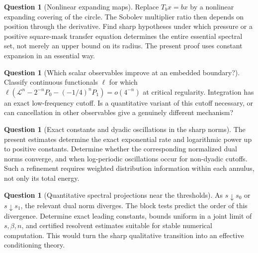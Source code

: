\documentclass[11pt,a4paper]{article}
\theoremstyle{definition}
\newtheorem{question}[theorem]{Question}
\theoremstyle{remark}
\newcommand{\Lop}{\mathcal L}
\numberwithin{equation}{section}
\begin{document}
\begin{question}[Nonlinear expanding maps]
Replace $T_bx=bx$ by a nonlinear expanding covering of the circle. The
Sobolev multiplier ratio then depends on position through the derivative.
Find sharp hypotheses under which pressure or a positive square-mask
transfer equation determines the entire essential spectral set, not merely
an upper bound on its radius. The present proof uses constant expansion
in an essential way.
\end{question}

\begin{question}[Which scalar observables improve at an embedded boundary?]
Classify continuous functionals $\ell$ for which
$\ell(\Lop^n-2^{-n}P_0-(-1/4)^nP_1)=o(4^{-n})$ at critical regularity.
Integration has an exact low-frequency cutoff. Is a quantitative variant
of this cutoff necessary, or can cancellation in other observables give
a genuinely different mechanism?
\end{question}

\begin{question}[Exact constants and dyadic oscillations in the sharp norms]
The present estimates determine the exact exponential rate and logarithmic
power up to positive constants. Determine whether the corresponding
normalized dual norms converge, and when log-periodic oscillations occur
for non-dyadic cutoffs. Such a refinement requires weighted distribution
information within each annulus, not only its total energy.
\end{question}

\begin{question}[Quantitative spectral projections near the thresholds]
As $s\downarrow s_0$ or $s\downarrow s_1$, the relevant dual norm diverges.
The block tests predict the order of this divergence. Determine exact
leading constants, bounds uniform in a joint limit of $s,\beta,n$, and
certified resolvent estimates suitable for stable numerical computation.
This would turn the sharp qualitative transition into an effective
conditioning theory.
\end{question}
\end{document}

